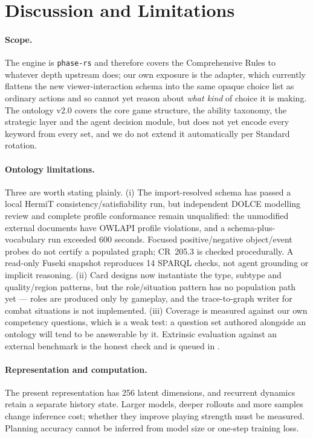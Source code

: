 \documentclass[11pt,a4paper]{article}
\theoremstyle{definition}
\theoremstyle{plain}
\begin{document}
\section{Discussion and Limitations}
\label{sec:discussion}
\label{sec:limits}

\paragraph{Scope.} The engine is \texttt{phase-rs} and therefore covers the Comprehensive Rules to whatever depth upstream does; our own exposure is the adapter, which currently flattens the new viewer-interaction schema into the same opaque choice list as ordinary actions and so cannot yet reason about \emph{what kind} of choice it is making. The ontology v2.0 covers the core game structure, the ability taxonomy, the strategic layer and the agent decision module, but does not yet encode every keyword from every set, and we do not extend it automatically per Standard rotation.

\paragraph{Ontology limitations.} Three are worth stating plainly. (i) The import-resolved schema has passed a local HermiT consistency/satisfiability run, but independent DOLCE modelling review and complete profile conformance remain unqualified: the unmodified external documents have OWLAPI profile violations, and a schema-plus-vocabulary run exceeded 600 seconds. Focused positive/negative object/event probes do not certify a populated graph; CR~205.3 is checked procedurally. A read-only Fuseki snapshot reproduces 14 SPARQL checks, not agent grounding or implicit reasoning. (ii) Card designs now instantiate the type, subtype and quality/region patterns, but the role/situation pattern has no population path yet --- roles are produced only by gameplay, and the trace-to-graph writer for combat situations is not implemented. (iii) Coverage is measured against our own competency questions, which is a weak test: a question set authored alongside an ontology will tend to be answerable by it. Extrinsic evaluation against an external benchmark is the honest check and is queued in .

\paragraph{Representation and computation.} The present representation has 256 latent dimensions, and recurrent dynamics retain a separate history state. Larger models, deeper rollouts and more samples change inference cost; whether they improve playing strength must be measured. Planning accuracy cannot be inferred from model size or one-step training loss.
\end{document}
